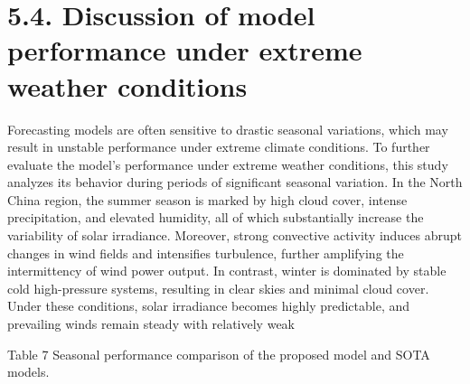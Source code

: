 \documentclass[
  10
]{article}
\begin{document}
\section{5.4. Discussion of model performance under extreme weather
conditions}\label{discussion-of-model-performance-under-extreme-weather-conditions}

Forecasting models are often sensitive to drastic seasonal variations,
which may result in unstable performance under extreme climate
conditions. To further evaluate the model's performance under extreme
weather conditions, this study analyzes its behavior during periods of
significant seasonal variation. In the North China region, the summer
season is marked by high cloud cover, intense precipitation, and
elevated humidity, all of which substantially increase the variability
of solar irradiance. Moreover, strong convective activity induces abrupt
changes in wind fields and intensifies turbulence, further amplifying
the intermittency of wind power output. In contrast, winter is dominated
by stable cold high-pressure systems, resulting in clear skies and
minimal cloud cover. Under these conditions, solar irradiance becomes
highly predictable, and prevailing winds remain steady with relatively
weak

Table 7 Seasonal performance comparison of the proposed model and SOTA
models.
\end{document}
